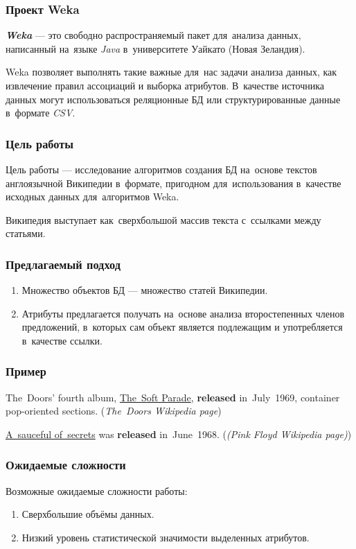 \documentclass{beamer}
\newcommand{\MARK}[1]{{\bf {\it #1}}}
\begin{document}
\begin{frame}
\frametitle{Проект Weka}
\MARK{Weka} --- это свободно распространяемый пакет для~анализа данных, 
написанный на~языке {\it Java} в~университете Уайкато (Новая Зеландия).

\vspace{1cm}

Weka позволяет выполнять такие важные для~нас задачи анализа данных, 
как извлечение правил ассоциаций и выборка атрибутов.
В~качестве источника данных могут использоваться реляционные БД или структурированные данные в~формате {\it CSV}.
\end{frame}

\begin{frame}
\frametitle{Цель работы}
Цель работы --- исследование алгоритмов создания БД на~основе текстов англоязычной Википедии в~формате,
пригодном для~использования в~качестве исходных данных для~алгоритмов Weka.

\vspace{5mm}

Википедия выступает как~сверхбольшой массив текста с~ссылками между статьями.
\end{frame}

\begin{frame}
\frametitle{Предлагаемый подход}
\begin{enumerate}
\item{
Множество объектов БД --- множество статей Википедии.
}

\item {
Атрибуты предлагается получать на~основе анализа второстепенных членов предложений, 
в~которых сам объект является подлежащим и употребляется в~качестве ссылки.
}
\end{enumerate}
\end{frame}

\begin{frame}
\frametitle{Пример}
The~Doors' fourth album, \underline{The~Soft Parade}, 
{\bf released} in~July~1969, 
container pop-oriented sections. 
({\it The~Doors Wikipedia page})

\vspace{1cm}

\underline{A~sauceful of~secrets} was {\bf released} in~June~1968. 
({\it(Pink Floyd Wikipedia page)})
\end{frame}

\begin{frame}
\frametitle{Ожидаемые сложности}

Возможные ожидаемые сложности работы:

\begin{enumerate}

\item{
Сверхбольшие объёмы данных.
}

\item{
Низкий уровень статистической значимости выделенных атрибутов.
}

\end{enumerate}
\end{frame}
\end{document}
